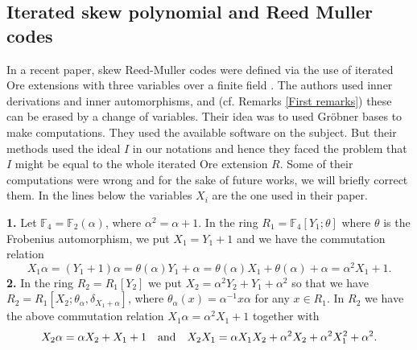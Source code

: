 \documentclass{amsproc}
\numberwithin{equation}{section}
\begin{document}
\subsection{Iterated skew polynomial and Reed Muller codes}

In a recent paper, skew Reed-Muller codes were defined via the use of iterated Ore extensions with three variables over a finite field \cite{bib1}.  The authors used inner derivations and inner automorphisms, and (cf. Remarks \ref{First remarks}) these can be erased by a change of variables.  Their idea was to used Gr\"obner bases to make computations.  They used the available software on the subject.  But their methods used the ideal $I$ in our notations and hence they faced the problem that $I$ might be equal to the whole iterated Ore extension $R$.   Some of their computations were wrong and for the sake of future works, we will briefly correct them. In the lines below the variables $X_i$ are the one used in their paper.
%

\textbf{1.} Let $\mathbb F_4=\mathbb F_2(\alpha)$,  where 
$\alpha^2=\alpha + 1$.  In the ring $R_{1}=\mathbb{F}_{4}\left[Y_{1} ; 
\theta\right]$ where $\theta$ is the Frobenius automorphism, we put $X_1=Y_1+1$ and we have the commutation relation
$$
X_{1} \alpha=(Y_1+1)\alpha=\theta(\alpha)Y_1+\alpha=
\theta(\alpha) X_{1}+ \theta(\alpha) +\alpha=\alpha^{2} X_{1}+1.
$$
\noindent \textbf{2.} In the ring $R_{2}=R_{1}\left[Y_{2} \right]$ we put $X_2=\alpha^2Y_2+Y_1+\alpha^2$ so that we have $R_2=R_1[X_2;\theta_\alpha,\delta_{X_1+\alpha}]$, where $\theta_\alpha(x)=\alpha^{-1}x\alpha$ for any $x\in R_1$.  In $R_2$ we have the above commutation relation $X_{1} \alpha=\alpha^{2} X_{1}+1$ together with
$$
X_{2} \alpha =\alpha X_{2}+X_{1}+1 \quad {\rm and} \quad 
X_2X_1=\alpha X_1X_2 +\alpha^2 X_2+\alpha^2X_1^2 +\alpha^2.
$$
\end{document}
